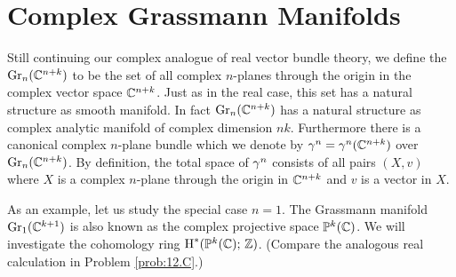 \documentclass[../main]{subfiles}
\begin{document}
\section{Complex Grassmann Manifolds}

Still continuing our complex analogue of real vector bundle theory, we define the  $\operatorname{Gr}_{n}(\mathbb C^{n+k})$ to be the set of all complex $n$-planes through the origin in the complex vector space $\mathbb C^{n+k}$. Just as in the real case, this set has a natural structure as smooth manifold. In fact $\operatorname{Gr}_{n}(\mathbb C^{n+k})$ has a natural structure as complex analytic manifold of complex dimension $nk$. Furthermore there is a canonical complex $n$-plane bundle which we denote by $\gamma^{n}=\gamma^{n}(\mathbb C^{n+k})$ over $\operatorname{Gr}_{n}(\mathbb C^{n+k})$. By definition, the total space of $\gamma^{n}$ consists of all pairs $(X, v)$ where $X$ is a complex $n$-plane through the origin in $\mathbb C^{n+k}$ and $v$ is a vector in $X$.

As an example, let us study the special case $n=1$. The Grassmann manifold $\operatorname{Gr}_{1}(\mathbb C^{k+1})$ is also known as the complex projective space $\mathbb{P}^{k}(\mathbb C)$. We will investigate the cohomology ring $\operatorname{H}^{\ast}(\mathbb{P}^k(\mathbb C) ;\, \mathbb{Z})$. (Compare the analogous real calculation in Problem \ref{prob:12.C}.)
\end{document}
